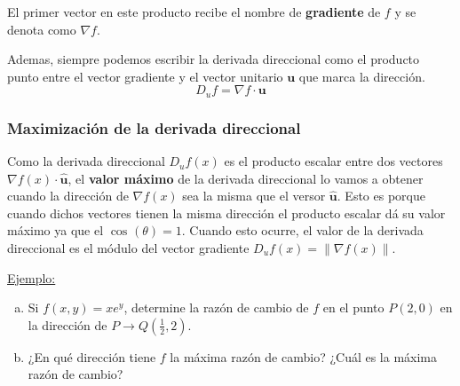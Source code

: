 \documentclass[12pt]{article}
\begin{document}
El primer vector en este producto recibe el nombre de \textbf{gradiente} de $ f $ y se denota como $ \nabla f $.

\vspace{0.2cm}
\vspace{0.2cm}

Ademas, siempre podemos escribir la derivada direccional como el producto punto entre el vector gradiente y el vector unitario $ \mathbf{u} $ que marca la dirección.
\[
D_{u}f = \nabla f \cdot \mathbf{u}
\]

\subsubsection{Maximización de la derivada direccional}
Como la derivada direccional $ D_{u}f(x) $ es el producto escalar entre dos vectores $ \nabla f(x) \cdot \mathbf{\hat{u}} $, el \textbf{valor máximo} de la derivada direccional lo vamos a obtener cuando la dirección de $ \nabla f(x) $ sea la misma que el versor $ \mathbf{\hat{u}} $. Esto es porque cuando dichos vectores tienen la misma dirección el producto escalar dá su valor máximo ya que el $ \cos^{}(\theta)=1 $. Cuando esto ocurre, el valor de la derivada direccional es el módulo del vector gradiente $ D_{u}f(x) = \lVert\nabla f(x)\rVert $.

\underline{Ejemplo:}

\begin{enumerate}[a)]
  \item Si $ f(x,y)=xe^y $, determine la razón de cambio de $ f $ en el punto $ P(2,0) $ en la dirección de $ P  \to Q(\frac{1}{2},2) $.

  \item ¿En qué dirección tiene $ f $ la máxima razón de cambio? ¿Cuál es la máxima razón de cambio?
\end{enumerate}
\end{document}
